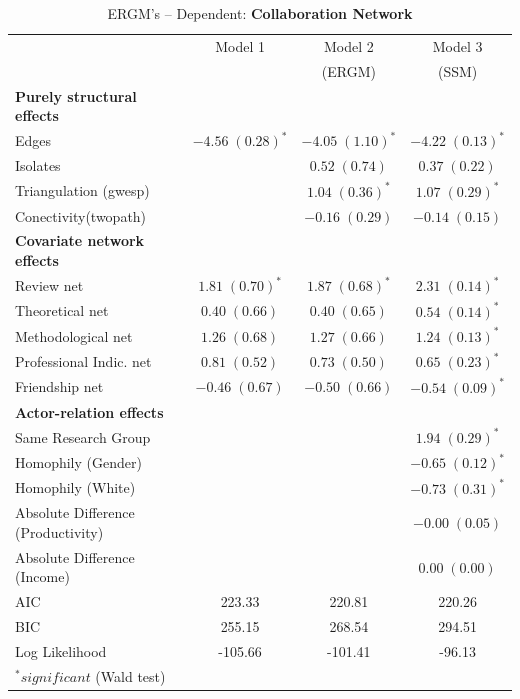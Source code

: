 \documentclass[12pt, english]{article}
\begin{document}
\begin{table}[!h]
	
		\centering
		\caption{ERGM's -- Dependent: \textbf{Collaboration Network}}
		\label{ergm_colab}
	
	\begin{tabular}{l c c c }
			\hline
			& Model 1 & Model 2 & Model 3 \\
			&         & (ERGM) & (SSM) \\
			\hline
			\textbf{Purely structural effects} & & & \\
			Edges  				  & $-4.56 \; (0.28)^{*}$ & $-4.05 \; (1.10)^{*}$ & $-4.22 \; (0.13)^{*}$ \\
			Isolates              &                         & $0.52 \; (0.74)$        & $0.37 \; (0.22)$        \\
			Triangulation (gwesp) &                         & $1.04 \; (0.36)^{*}$   & $1.07 \; (0.29)^{*}$  \\
			Conectivity(twopath)  &                         & $-0.16 \; (0.29)$       & $-0.14 \; (0.15)$       \\
			\textbf{Covariate network effects} & & & \\
			Review net            & $1.81 \; (0.70)^{*}$   & $1.87 \; (0.68)^{*}$   & $2.31 \; (0.14)^{*}$  \\
			Theoretical net       & $0.40 \; (0.66)$        & $0.40 \; (0.65)$        & $0.54 \; (0.14)^{*}$  \\
			Methodological net    & $1.26 \; (0.68)$        & $1.27 \; (0.66)$        & $1.24 \; (0.13)^{*}$  \\
			Professional Indic. net & $0.81 \; (0.52)$        & $0.73 \; (0.50)$        & $0.65 \; (0.23)^{*}$   \\
			Friendship net        & $-0.46 \; (0.67)$       & $-0.50 \; (0.66)$       & $-0.54 \; (0.09)^{*}$ \\
			\textbf{Actor-relation effects} & & & \\
			Same Research Group        &                         &                    & $1.94 \; (0.29)^{*}$  \\
			Homophily (Gender)        &                         &                     & $-0.65 \; (0.12)^{*}$ \\
			Homophily (White)         &                         &                     & $-0.73 \; (0.31)^{*}$   \\
			Absolute Difference (Productivity) &            &                         & $-0.00 \; (0.05)$       \\
			Absolute Difference (Income)       &            &                         & $0.00 \; (0.00)$        \\
			\hline
			AIC                   & 223.33                  & 220.81                  & 220.26                  \\
			BIC                   & 255.15                  & 268.54                  & 294.51                  \\
			Log Likelihood        & -105.66                 & -101.41                 & -96.13                  \\
			\hline
			\multicolumn{4}{l}{\scriptsize{$^*significant$ (Wald test)}}
		\end{tabular}
	

\end{table}
\end{document}
